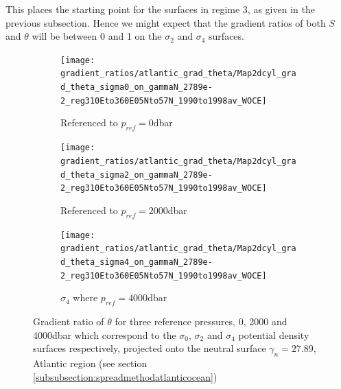 This places the starting point for the surfaces in regime 3, as given in the previous subsection. Hence we might expect that the gradient ratios of both $S$ and $\theta$ will be between 0 and 1 on the $\sigma_2$ and $\sigma_4$ surfaces.

\begin{figure}[htbp]
    \centering
     
     \begin{subfigure}{0.4\textwidth}
         
         \texttt{[image: gradient\_ratios/atlantic\_grad\_theta/Map2dcyl\_grad\_theta\_sigma0\_on\_gammaN\_2789e-2\_reg310Eto360E05Nto57N\_1990to1998av\_WOCE]}
         \caption{Referenced to $p_{ref} = 0$dbar}
         \label{fig:subplot_atlantic_grad_theta_sig0}
     \end{subfigure}
     \begin{subfigure}{0.4\textwidth}
         
         \texttt{[image: gradient\_ratios/atlantic\_grad\_theta/Map2dcyl\_grad\_theta\_sigma2\_on\_gammaN\_2789e-2\_reg310Eto360E05Nto57N\_1990to1998av\_WOCE]}
         \caption{Referenced to $p_{ref} = 2000$dbar}
         \label{fig:subplot_atlantic_grad_theta_sig2}
     \end{subfigure}
     
     \begin{subfigure}{0.4\textwidth}
         
         \texttt{[image: gradient\_ratios/atlantic\_grad\_theta/Map2dcyl\_grad\_theta\_sigma4\_on\_gammaN\_2789e-2\_reg310Eto360E05Nto57N\_1990to1998av\_WOCE]}
         \caption{$\sigma_4$ where $p_{ref} = 4000$dbar}
         \label{fig:subplot_atlantic_grad_theta_sig4}
     \end{subfigure}
    \caption{Gradient ratio of $\theta$ for three reference pressures, 0, 2000 and 4000dbar which correspond to the $\sigma_0$, $\sigma_2$ and $\sigma_4$ potential density surfaces respectively, projected onto the neutral surface $\gamma_n = 27.89$, Atlantic region (see section \ref{subsubsection:spreadmethodatlanticocean})}
    \label{fig:atlantic_grad_theta}
    
\end{figure}


